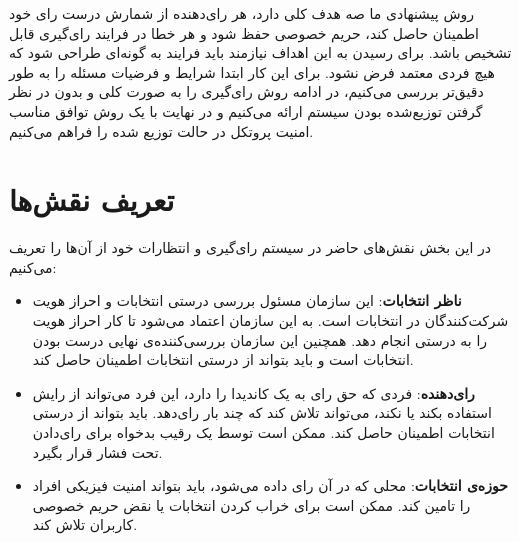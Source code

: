 روش پیشنهادی ما صه هدف کلی دارد، هر رای‌دهنده از شمارش درست رای خود اطمینان حاصل کند، حریم خصوصی حفظ شود و هر خطا در فرایند رای‌گیری قابل تشخیص باشد. برای رسیدن به این اهداف نیازمند باید فرایند به گونه‌ای طراحی شود که هیچ فردی معتمد فرض نشود. برای این کار ابتدا شرایط و فرضیات مسئله را به طور دقیق‌تر بررسی می‌کنیم، در ادامه روش رای‌گیری را به صورت کلی و بدون در نظر گرفتن توزیع‌شده بودن سیستم ارائه می‌کنیم و در نهایت با یک روش توافق مناسب امنیت پروتکل در حالت توزیع شده را فراهم می‌کنیم. 
\section{تعریف نقش‌ها}
در این بخش نقش‌های حاضر در سیستم رای‌گیری و انتظارات خود از آن‌ها را تعریف می‌کنیم:
\begin{itemize}
	\item
	\textbf{ناظر انتخابات}:
	این سازمان مسئول بررسی درستی انتخابات و احراز هویت شرکت‌کنندگان در انتخابات است. به این سازمان اعتماد می‌شود تا کار احراز هویت را به درستی انجام دهد. همچنین این سازمان بررسی‌کننده‌ی نهایی درست بودن انتخابات است و باید بتواند از درستی انتخابات اطمینان حاصل کند.
	\item
	\textbf{رای‌دهنده}:
	فردی که حق رای به یک کاندیدا را دارد، این فرد می‌تواند از رایش استفاده بکند یا نکند، می‌تواند تلاش کند که چند بار رای‌دهد. باید بتواند از درستی انتخابات اطمینان حاصل کند. ممکن است توسط یک رقیب بدخواه برای رای‌دادن تحت فشار قرار بگیرد.
	\item
	\textbf{حوزه‌ی انتخابات}:
	محلی که در آن رای داده می‌شود، باید بتواند امنیت فیزیکی افراد را تامین کند. ممکن است برای خراب کردن انتخابات یا نقض حریم خصوصی کاربران تلاش کند. 
\end{itemize}
